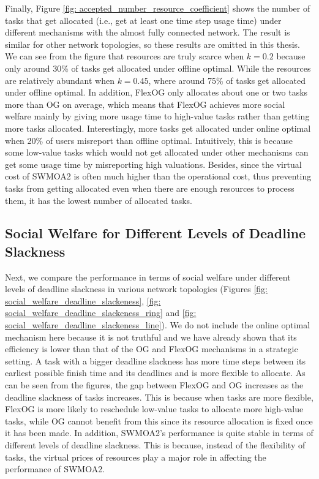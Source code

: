 \documentclass[11pt]{phdthesis}
\begin{document}
Finally, Figure \ref{fig: accepted_number_resource_coefficient} shows the number of tasks that get allocated (i.e., get at least one time step usage time) under different mechanisms with the almost fully connected network. The result is similar for other network topologies, so these results are omitted in this thesis. We can see from the figure that resources are truly scarce when $ k= 0.2 $ because only around 30\% of tasks get allocated under offline optimal. While the resources are relatively abundant when $ k = 0.45 $, where around 75\% of tasks get allocated under offline optimal. In addition, FlexOG only allocates about one or two tasks more than OG on average, which means that FlexOG achieves more social welfare mainly by giving more usage time to high-value tasks rather than getting more tasks allocated. Interestingly, more tasks get allocated under online optimal when 20\% of users misreport than offline optimal. Intuitively, this is because some low-value tasks which would not get allocated under other mechanisms can get some usage time by misreporting high valuations. Besides, since the virtual cost of SWMOA2 is often much higher than the operational cost, thus preventing tasks from getting allocated even when there are enough resources to process them, it has the lowest number of allocated tasks. 



\subsection{Social Welfare for Different Levels of Deadline Slackness}

Next, we compare the performance in terms of social welfare under different levels of deadline slackness in various network topologies (Figures \ref{fig: social_welfare_deadline_slackeness}, \ref{fig: social_welfare_deadline_slackeness_ring} and \ref{fig: social_welfare_deadline_slackeness_line}). We do not include the online optimal mechanism here because it is not truthful and we have already shown that its efficiency is lower than that of the OG and FlexOG mechanisms in a strategic setting. A task with a bigger deadline slackness has more time steps between its earliest possible finish time and its deadlines and is more flexible to allocate. As can be seen from the figures, the gap between FlexOG and OG increases as the deadline slackness of tasks increases. This is because when tasks are more flexible, FlexOG is more likely to reschedule low-value tasks to allocate more high-value tasks, while OG cannot benefit from this since its resource allocation is fixed once it has been made. In addition, SWMOA2's performance is quite stable in terms of different levels of deadline slackness. This is because, instead of the flexibility of tasks, the virtual prices of resources play a major role in affecting the performance of SWMOA2.
\end{document}
